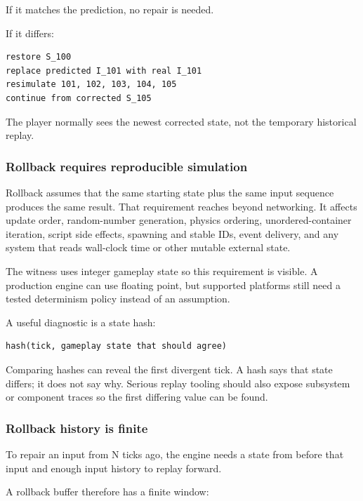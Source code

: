 If it matches the prediction, no repair is needed.

If it differs:

\begin{verbatim}
restore S_100
replace predicted I_101 with real I_101
resimulate 101, 102, 103, 104, 105
continue from corrected S_105
\end{verbatim}

The player normally sees the newest corrected state, not the temporary historical replay.

\subsubsection{Rollback requires reproducible simulation}\label{06-engine-ii-ch047-rollback-requires-reproducible-simulation}

Rollback assumes that the same starting state plus the same input sequence produces the same result. That requirement reaches beyond networking. It affects update order, random-number generation, physics ordering, unordered-container iteration, script side effects, spawning and stable IDs, event delivery, and any system that reads wall-clock time or other mutable external state.

The witness uses integer gameplay state so this requirement is visible. A production engine can use floating point, but supported platforms still need a tested determinism policy instead of an assumption.

A useful diagnostic is a state hash:

\begin{verbatim}
hash(tick, gameplay state that should agree)
\end{verbatim}

Comparing hashes can reveal the first divergent tick. A hash says that state differs; it does not say why. Serious replay tooling should also expose subsystem or component traces so the first differing value can be found.

\subsubsection{Rollback history is finite}\label{06-engine-ii-ch047-rollback-history-is-finite}

To repair an input from N ticks ago, the engine needs a state from before that input and enough input history to replay forward.

A rollback buffer therefore has a finite window:

